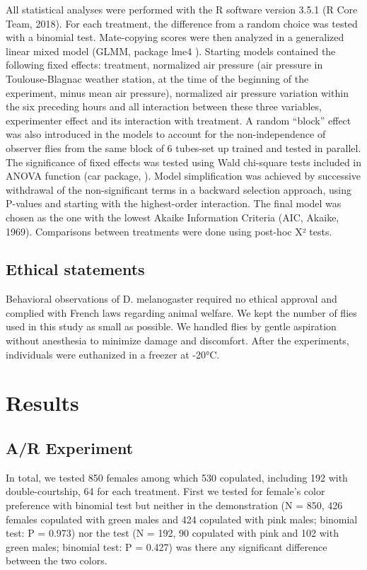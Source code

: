 \documentclass[a4paper, 12pt]{article}
\begin{document}
	All statistical analyses were performed with the R software version 3.5.1 (R Core Team, 2018).
	For each treatment, the difference from a random choice was tested with a binomial test. Mate-copying scores were then analyzed in a generalized linear mixed model (GLMM, package lme4 \parencite{bates_fitting_2015}). Starting models contained the following fixed effects: treatment, normalized air pressure (air pressure in Toulouse-Blagnac weather station, at the time of the beginning of the experiment, minus mean air pressure), normalized air pressure variation within the six preceding hours and all interaction between these three variables, experimenter effect and its interaction with treatment. A random “block” effect was also introduced in the models to account for the non-independence of observer flies from the same block of 6 tubes-set up trained and tested in parallel. The significance of fixed effects was tested using Wald chi-square tests included in ANOVA function (car package, \textcite{fox_r_2018} ). Model simplification was achieved by successive withdrawal of the non-significant terms in a backward selection approach, using P-values and starting with the highest-order interaction. The final model was chosen as the one with the lowest Akaike Information Criteria (AIC, Akaike, 1969). Comparisons between treatments were done using post-hoc X² tests. 

	\subsection{Ethical statements}

	Behavioral observations of D. melanogaster required no ethical approval and complied with French laws regarding animal welfare. We kept the number of flies used in this study as small as possible. We handled flies by gentle aspiration without anesthesia to minimize damage and discomfort. After the experiments, individuals were euthanized in a freezer at -20°C.

	\section{Results}

	\subsection{A/R Experiment}
	\label{subsec:AR-experiment}

	In total, we tested 850 females among which 530 copulated, including 192 with double-courtship, 64 for each treatment. First we tested for female's color preference with binomial test but neither in the demonstration (N = 850, 426 females copulated with green males and 424 copulated with pink males; binomial test: P = 0.973) nor the test (N = 192, 90 copulated with pink and 102 with green males; binomial test: P = 0.427) was there any significant difference between the two colors.
\end{document}
